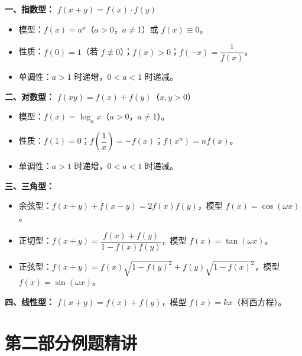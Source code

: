\documentclass[12pt,a4paper]{ctexart}
\begin{document}
\begin{knowledgebox}[三大类抽象函数模型]
\textbf{一、指数型：} $f(x+y)=f(x)\cdot f(y)$

\begin{itemize}
  \item 模型：$f(x)=a^x$（$a>0$，$a\ne1$）或 $f(x)\equiv0$。
  \item 性质：$f(0)=1$（若 $f\not\equiv0$）；$f(x)>0$；$f(-x)=\dfrac{1}{f(x)}$。
  \item 单调性：$a>1$ 时递增，$0<a<1$ 时递减。
\end{itemize}

\medskip
\textbf{二、对数型：} $f(xy)=f(x)+f(y)$（$x,y>0$）

\begin{itemize}
  \item 模型：$f(x)=\log_a x$（$a>0$，$a\ne1$）。
  \item 性质：$f(1)=0$；$f\!\left(\dfrac{1}{x}\right)=-f(x)$；$f(x^n)=nf(x)$。
  \item 单调性：$a>1$ 时递增，$0<a<1$ 时递减。
\end{itemize}

\medskip
\textbf{三、三角型：}

\begin{itemize}
  \item 余弦型：$f(x+y)+f(x-y)=2f(x)f(y)$，模型 $f(x)=\cos(\omega x)$。
  \item 正切型：$f(x+y)=\dfrac{f(x)+f(y)}{1-f(x)f(y)}$，模型 $f(x)=\tan(\omega x)$。
  \item 正弦型：$f(x+y)=f(x)\sqrt{1-f(y)^2}+f(y)\sqrt{1-f(x)^2}$，模型 $f(x)=\sin(\omega x)$。
\end{itemize}

\medskip
\textbf{四、线性型：} $f(x+y)=f(x)+f(y)$，模型 $f(x)=kx$（柯西方程）。
\end{knowledgebox}


\newpage
\section*{\textcolor{mainblue}{第二部分\quad 例题精讲}}
\end{document}
